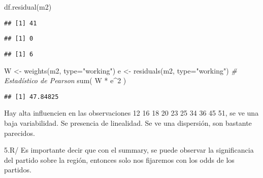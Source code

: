 \documentclass[
]{article}
\newenvironment{Shaded}{\begin{snugshade}}{\end{snugshade}}
\newcommand{\AttributeTok}[1]{\textcolor[rgb]{0.77,0.63,0.00}{#1}}
\newcommand{\CommentTok}[1]{\textcolor[rgb]{0.56,0.35,0.01}{\textit{#1}}}
\newcommand{\DecValTok}[1]{\textcolor[rgb]{0.00,0.00,0.81}{#1}}
\newcommand{\FunctionTok}[1]{\textcolor[rgb]{0.00,0.00,0.00}{#1}}
\newcommand{\NormalTok}[1]{#1}
\newcommand{\OtherTok}[1]{\textcolor[rgb]{0.56,0.35,0.01}{#1}}
\newcommand{\SpecialCharTok}[1]{\textcolor[rgb]{0.00,0.00,0.00}{#1}}
\newcommand{\StringTok}[1]{\textcolor[rgb]{0.31,0.60,0.02}{#1}}
\begin{document}
\begin{Shaded}
\begin{Highlighting}[]
\FunctionTok{df.residual}\NormalTok{(m2)}
\end{Highlighting}
\end{Shaded}

\begin{verbatim}
## [1] 41
\end{verbatim}

\begin{Shaded}
\end{Shaded}

\begin{verbatim}
## [1] 0
\end{verbatim}

\begin{Shaded}
\end{Shaded}

\begin{verbatim}
## [1] 6
\end{verbatim}

\begin{Shaded}
\begin{Highlighting}[]
\NormalTok{W }\OtherTok{\textless{}{-}} \FunctionTok{weights}\NormalTok{(m2, }\AttributeTok{type=}\StringTok{"working"}\NormalTok{)}
\NormalTok{e }\OtherTok{\textless{}{-}} \FunctionTok{residuals}\NormalTok{(m2, }\AttributeTok{type=}\StringTok{"working"}\NormalTok{)}
\CommentTok{\# Estadístico de Pearson}
\FunctionTok{sum}\NormalTok{( W }\SpecialCharTok{*}\NormalTok{ e}\SpecialCharTok{\^{}}\DecValTok{2}\NormalTok{ )}
\end{Highlighting}
\end{Shaded}

\begin{verbatim}
## [1] 47.84825
\end{verbatim}

Hay alta influencien en las observaciones 12 16 18 20 23 25 34 36 45 51,
se ve una baja variabilidad. Se presencia de linealidad. Se ve una
dispersión, son bastante parecidos.

5.R/ Es importante decir que con el summary, se puede observar la
significancia del partido sobre la región, entonces solo nos fijaremos
con los odds de los partidos.
\end{document}
